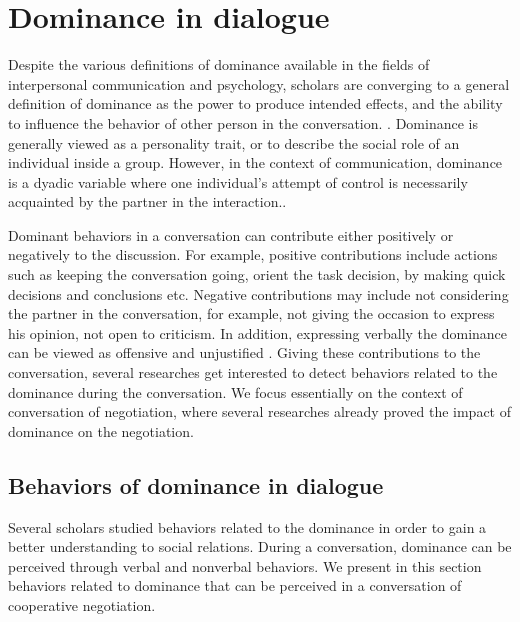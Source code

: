 \documentclass{llncs}
\begin{document}
					\section{Dominance in dialogue}
					\par Despite the various definitions of dominance available in the fields of interpersonal communication and psychology, scholars are converging to a general definition of dominance as the power to produce intended effects, and the ability to influence the behavior of other person in the conversation. \cite{dunbar2005perceptions}. Dominance is generally viewed as a personality trait, or to describe the social role of an individual inside a group. However, in the context of communication, dominance is a dyadic variable where one individual's attempt of control is necessarily acquainted by the partner in the interaction.\cite{dunbar2005perceptions}. 
					\par Dominant behaviors in a conversation can contribute either positively or negatively to the discussion. For example, positive contributions include actions such as keeping the conversation going, orient the task decision, by making quick decisions and conclusions etc. Negative contributions may include not considering the partner in the conversation, for example, not giving the occasion to express his opinion, not open to criticism. In addition, expressing verbally the dominance can be viewed as offensive and unjustified \cite{zablotskaya2012relating}. Giving these contributions to the conversation, several researches get interested to detect behaviors related to the dominance during the conversation. We focus essentially on the context of conversation of negotiation, where several researches already proved the impact of dominance on the negotiation\cite{van2006power}.
					
					\subsection{Behaviors of dominance in dialogue}
					Several scholars studied behaviors related to the dominance in order to gain a better understanding to social relations. During a conversation, dominance can be perceived through verbal and nonverbal behaviors. We present in this section behaviors related to dominance that can be perceived in a conversation of cooperative negotiation.
\end{document}
